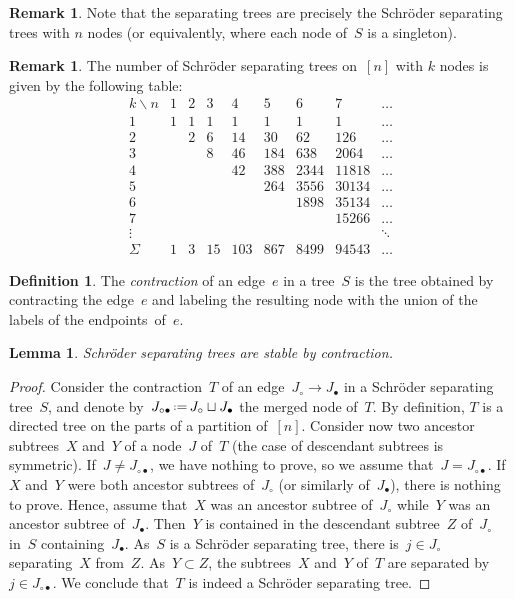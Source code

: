 \documentclass{amsart}
\newtheorem{lemma}[theorem]{Lemma}
\theoremstyle{definition}
\newtheorem{definition}[theorem]{Definition}
\newtheorem{remark}[theorem]{Remark}
\newcommand{\eqdef}{\mbox{\,\raisebox{0.2ex}{\scriptsize\ensuremath{\mathrm:}}\ensuremath{=}\,}} %
\newcommand{\darkblue}{\color{darkblue}} %
\newcommand{\defn}[1]{\textsl{\darkblue #1}} %
\begin{document}
\begin{remark}
Note that the separating trees are precisely the Schröder separating trees with $n$ nodes (or equivalently, where each node of~$S$ is a singleton).
\end{remark}

\begin{remark}
The number of Schröder separating trees on~$[n]$ with $k$ nodes is given by the following table:
\[
\begin{array}{c|ccccccccc}
k \backslash n & 1 & 2 & 3 & 4 & 5 & 6 & 7 & \dots \\
\hline
1 & 1 & 1 & 1 & 1 & 1 & 1 & 1 & \dots\\
2 & & 2 & 6 & 14 & 30 & 62 & 126 & \dots \\
3 & & & 8 & 46 & 184 & 638 & 2064 & \dots\\
4 & & & & 42 & 388 & 2344 & 11818 & \dots\\
5 & & & & & 264 & 3556 & 30134 & \dots\\
6 & & & & & & 1898 & 35134 & \dots\\ 
7 & & & & & & & 15266 & \dots\\ 
\vdots & & & & & & & & \ddots \\
\hline
\Sigma & 1 & 3 & 15 & 103 & 867 & 8499 & 94543 & \dots
\end{array}
\]
\end{remark}


\begin{definition}
The \defn{contraction} of an edge~$e$ in a tree~$S$ is the tree obtained by contracting the edge~$e$ and labeling the resulting node with the union of the labels of the endpoints~of~$e$.
\end{definition}

\begin{lemma}
\label{lem:contractionSchroderSeparatingTree}
Schröder separating trees are stable by contraction.
\end{lemma}

\begin{proof}
Consider the contraction~$T$ of an edge~$J_\circ \to J_\bullet$ in a Schröder separating tree~$S$, and denote by~$J_{\circ\bullet} \eqdef J_\circ \sqcup J_\bullet$ the merged node of~$T$.
By definition, $T$ is a directed tree on the parts of a partition of~$[n]$.
Consider now two ancestor subtrees~$X$ and~$Y$ of a node~$J$ of~$T$ (the case of descendant subtrees is symmetric).
If~$J \ne J_{\circ\bullet}$, we have nothing to prove, so we assume that~$J = J_{\circ\bullet}$.
If~$X$ and~$Y$ were both ancestor subtrees of~$J_\circ$ (or similarly of~$J_\bullet$), there is nothing to prove.
Hence, assume that~$X$ was an ancestor subtree of~$J_\circ$ while~$Y$ was an ancestor subtree of~$J_\bullet$.
Then~$Y$ is contained in the descendant subtree~$Z$ of~$J_\circ$ in~$S$ containing~$J_\bullet$.
As~$S$ is a Schröder separating tree, there is~$j \in J_\circ$ separating~$X$ from~$Z$.
As~$Y \subset Z$, the subtrees~$X$ and~$Y$ of~$T$ are separated by~$j \in J_{\circ\bullet}$.
We conclude that~$T$ is indeed a Schröder separating tree.
\end{proof}
\end{document}
